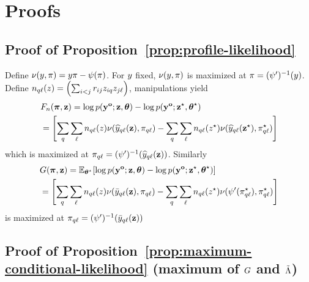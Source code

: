 \section{Proofs}
\label{sec:proofPL}



\subsection{Proof of Proposition~\ref{prop:profile-likelihood}} 
\proofbegin
Define
    $\nu(y, \pi)  = y \pi - \psi (\pi)$. For $y$ fixed, $\nu(y, \pi)$ is maximized at $\pi = (\psi')^{-1}(y)$. Define $n_{q\ell}(z)=\left( \sum_{i<j}r_{i j}z_{i q}z_{j\ell} \right)$, manipulations yield
\begin{align*}
  &\Fn(\bal, \bz)= \log \prob(\byo; \bz,\btheta) - \log {\prob(\byo; \bzs,\bthetas)} \\
  & = \left[ \sum_{\kk} \sum_{\el} n_{q\el}(z) \nu(\hyklz, \alkl)  - \sum_{\kk} \sum_{\el} n_{q\el}(z^\star)\nu(\hykl(\bzs), \alskl) \right]
\end{align*}
which is maximized at $\pi_{q\ell} = (\psi')^{-1}(\widehat{y}_{q\ell}(\mathbf{z}))$. Similarly
\begin{align*}
 & \G(\bal, \bz)  = \Esp_{\bthetas} [ \log \prob(\byo; \bz,\btheta) - \log \prob(\byo; \bzs,\bthetas) ] \\
  & = \left[ \sum_{\kk} \sum_{\el} n_{q\el}(z) \nu(\baryklz, \alkl)  - \sum_{\kk} \sum_{\el} n_{q\el}(z^\star) \nu(\normp(\alskl), \alskl) \right]
\end{align*}
is maximized at $\pi_{q\ell} = (\psi')^{-1}(\bar{y}_{q\ell}(\mathbf{z}))$
\proofend

\subsection{Proof of Proposition~\ref{prop:maximum-conditional-likelihood}  (maximum of $G$ and $\tilde{\Lambda}$)} 

